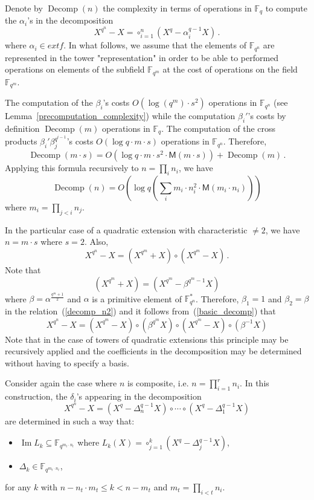 \documentclass{sig-alternate}
\newcommand{\ff}[1]{\mathbb{F}_{#1}}
\newcommand{\qq}{q}
\newcommand{\nn}{n}
\newcommand{\qn}{{\qq^\nn}}
\newcommand{\basef}{\ff{\qq}}
\newcommand{\extf}{\ff{\qn}}
\DeclareMathOperator{\Ima}{Im}
\DeclareMathOperator{\Decomp}{Decomp}
\newcommand{\bigO}{O}
\newcommand{\Mul}{\mathsf{M}}
\begin{document}
 Denote by $\Decomp(\nn)$ the complexity in terms of operations in $\basef$ to compute the $\alpha_i$'s in the decomposition 
$$X^{\qq^\nn}-X=\circ_{i=1}^{\nn} (X^q-\alpha_i^{q-1} X)\,.$$
where $\alpha_i \in extf$. In what follows, we assume that the elements of $\mathbb{F}_{\qq^{\nn}}$ are represented in the tower "representation" in order to be able to 
performed operations on elements of the subfield $\mathbb{F}_{\qq^m}$ at the cost of operations on the field $\mathbb{F}_{\qq^m}$.


The computation of the  $\beta_i$'s costs $\bigO(\log (q^m) \cdot s^2)$ operations in $\extf$ (see Lemma~\ref{precomputation_complexity}) 
 while the computation $\beta_i'$'s costs by definition $\Decomp(m)$ operations in $\basef$. The computation of the cross products  $\beta_i'  \beta_j^{\qq^{i-1}}$'s costs $\bigO(\log q \cdot m \cdot s)$ operations in $\extf$. Therefore,
$$\Decomp(m\cdot s)=\bigO(\log q \cdot m \cdot s^2 \cdot \Mul(m \cdot s)) +  \Decomp(m)\,.$$
Applying this formula recursively to $n=\prod_i n_i$, we have
$$\Decomp(n)=\bigO\left(\log q \left(\sum_i m_i \cdot n_i^2 \cdot \Mul(m_i \cdot n_i) \right) \right)$$
where $m_i=\prod_{j < i} n_j$.


\medskip

 In the particular case of a quadratic extension with characteristic $\ne 2$, we have $n=m \cdot s$ where $s=2$. Also,
$$X^{\qq^\nn}-X=(X^{\qq^{m}}+X)  \circ (X^{\qq^{m}}-X)  \,.$$
Note that 
$$(X^{\qq^{m}}+X)=(X^{\qq^{m}} - \beta^{\qq^{m}-1} X)$$
 where $\beta=\alpha^{\frac{\qq^{m}+1}{2}}$ and $\alpha$ is a primitive element of $\extf^\ast$.
Therefore, $\beta_1=1$ and $\beta_2=\beta$ in the relation~(\ref{decomp_n2}) and it follows from~(\ref{basic_decomp}) that
$$X^{\qq^\nn}-X=(X^{\qq^{m}}-X) \circ  (\beta^{\qq^{m}} X) \circ (X^{\qq^{m}}-X) \circ  (\beta^{-1} X) $$
Note that in the case of towers of quadratic extensions this principle may be recursively applied and the coefficients in the decomposition may be determined without having to specify a basis.

\medskip
 
\medskip 
 
 Consider again the case where $\nn$ is composite, i.e. $n=\prod_{i=1}^r n_i$. In this construction, the $\delta_i$'s appearing in the decomposition
$$X^{\qq^\nn}-X=(X^\qq-\Delta_n^{\qq-1} X) \circ  \cdots \circ (X^\qq-\Delta_1^{\qq-1} X) $$
are determined in such a way that:
\begin{itemize}
\item $\Ima L_k \subseteq \mathbb{F}_{\qq^{m_t \cdot n_t}}$ where $L_k(X)=\circ_{j=1}^k (X^q-\Delta_j^{q-1} X)$,
\item $\Delta_{k} \in \mathbb{F}_{\qq^{m_t \cdot n_t}}$,
\end{itemize}
for any $k$ with $n-n_t \cdot m_{t} \le k < n-m_{t}$ and $m_t=\prod_{i < t} n_i$.
\end{document}
